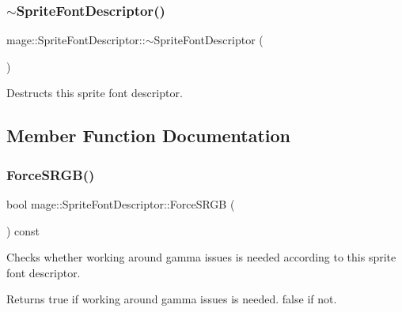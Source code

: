 \subsubsection{\texorpdfstring{$\sim$\+Sprite\+Font\+Descriptor()}{~SpriteFontDescriptor()}}
{\footnotesize\ttfamily mage\+::\+Sprite\+Font\+Descriptor\+::$\sim$\+Sprite\+Font\+Descriptor (\begin{DoxyParamCaption}{ }\end{DoxyParamCaption})\hspace{0.3cm}{\ttfamily [default]}}

Destructs this sprite font descriptor. 

\subsection{Member Function Documentation}
\hypertarget{classmage_1_1_sprite_font_descriptor_a6124a9d8323768b970033eef43d0be6f}{}\label{classmage_1_1_sprite_font_descriptor_a6124a9d8323768b970033eef43d0be6f} 
\subsubsection{\texorpdfstring{Force\+S\+R\+G\+B()}{ForceSRGB()}}
{\footnotesize\ttfamily bool mage\+::\+Sprite\+Font\+Descriptor\+::\+Force\+S\+R\+GB (\begin{DoxyParamCaption}{ }\end{DoxyParamCaption}) const\hspace{0.3cm}{\ttfamily [noexcept]}}

Checks whether working around gamma issues is needed according to this sprite font descriptor.

\begin{DoxyReturn}{Returns}
{\ttfamily true} if working around gamma issues is needed. {\ttfamily false} if not. 
\end{DoxyReturn}
\hypertarget{classmage_1_1_sprite_font_descriptor_ae5990d08d21ca2d60d3cdc46508817c7}{}\label{classmage_1_1_sprite_font_descriptor_ae5990d08d21ca2d60d3cdc46508817c7} 
